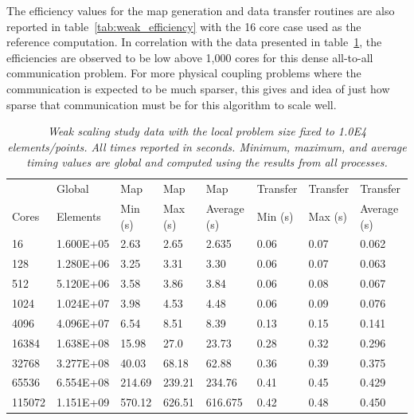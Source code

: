 \documentclass{mc2013}
\begin{document}
The efficiency values for the map generation and data transfer
routines are also reported in table~\ref{tab:weak_efficiency} with the
16 core case used as the reference computation. In correlation with
the data presented in table~\ref{tab:weak_scaling}, the efficiencies
are observed to be low above 1,000 cores for this dense all-to-all
communication problem. For more physical coupling problems where the
communication is expected to be much sparser, this gives and idea of
just how sparse that communication must be for this algorithm to scale
well.

\begin{table}[htpb!]
  \begin{center}
    \begin{tabular}{llllllll}\hline\hline
      \multicolumn{1}{l}{} & 
      \multicolumn{1}{l}{Global} & 
      \multicolumn{1}{l}{Map} & 
      \multicolumn{1}{l}{Map} & 
      \multicolumn{1}{l}{Map} & 
      \multicolumn{1}{l}{Transfer} & 
      \multicolumn{1}{l}{Transfer} & 
      \multicolumn{1}{l}{Transfer}\\
      \multicolumn{1}{l}{Cores} & 
      \multicolumn{1}{l}{Elements} & 
      \multicolumn{1}{l}{Min (s)} & 
      \multicolumn{1}{l}{Max (s)} & 
      \multicolumn{1}{l}{Average (s)} & 
      \multicolumn{1}{l}{Min (s)} & 
      \multicolumn{1}{l}{Max (s)} & 
      \multicolumn{1}{l}{Average (s)}\\ \hline\hline
16 &	1.600E+05 & 2.63 &	2.65 &	  2.635 &	0.06 & 0.07 &	0.062 \\
128 &	1.280E+06 & 3.25 &	3.31 &	  3.30 &	0.06 &	0.07 &	0.063 \\
512 &	5.120E+06 & 3.58 &	3.86 &	  3.84 &	0.06 &	0.08 &	0.067 \\
1024 &	1.024E+07 & 3.98 &	4.53 &    4.48 &	0.06 &	0.09 &	0.076 \\
4096 &	4.096E+07 & 6.54 &	8.51 &	  8.39 &	0.13 &	0.15 &	0.141 \\
16384 &	1.638E+08 & 15.98 &	27.0 &	  23.73 &	0.28 &	0.32 &	0.296 \\
32768 &	3.277E+08 & 40.03 &	68.18 &   62.88 &	0.36 &	0.39 &	0.375 \\
65536 &	6.554E+08 & 214.69 & 239.21	& 234.76 &	0.41 &	0.45 & 0.429 \\
115072 & 1.151E+09 & 570.12 & 626.51	& 616.675 &	0.42 &	0.48 &	0.450 \\
      \hline\hline
    \end{tabular}
  \end{center}
  \caption{\sl Weak scaling study data with the local problem size
    fixed to 1.0E4 elements/points. All times reported in
    seconds. Minimum, maximum, and average timing values are global
    and computed using the results from all processes.}
  \label{tab:weak_scaling}
\end{table}
\end{document}
